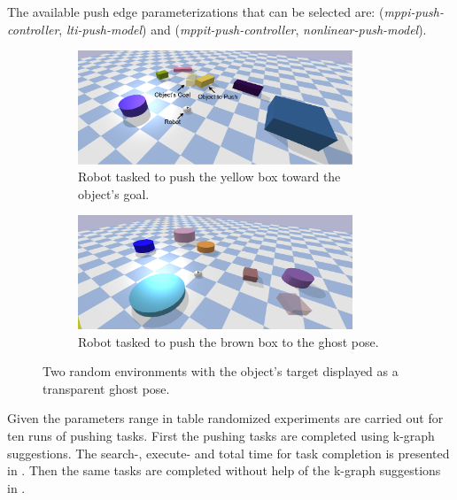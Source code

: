 The available push edge parameterizations that can be selected are: (\textit{mppi-push-controller}, \textit{lti-push-model}) and (\textit{mppit-push-controller}, \textit{nonlinear-push-model}).\bs

\begin{figure}[H]
    \centering
    \begin{subfigure}{\textwidth}
    \centering
    \includegraphics[width=0.9\textwidth]{figures/results/random_1.drawio}
    \caption{Robot tasked to push the yellow box toward the object's goal.}
    \end{subfigure}

    \vspace{0.2cm}
    \begin{subfigure}{\textwidth}
    \centering
    \includegraphics[width=0.9\textwidth]{figures/results/random_2}
    \caption{Robot tasked to push the brown box to the ghost pose.}
    \end{subfigure}
    \caption{Two random environments with the object's target displayed as a transparent ghost pose.}%
    \label{fig:random_environnment}
\end{figure}

Given the parameters range in table  randomized experiments are carried out for ten runs of pushing tasks. First the pushing tasks are completed using \ac{k-graph} suggestions. The search-, execute- and total time for task completion is presented in . Then the same tasks are completed without help of the \ac{k-graph} suggestions in . 


